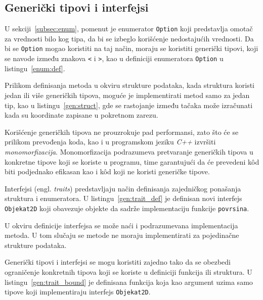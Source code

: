 \documentclass[12pt,oneside]{memoir}
\begin{document}


\subsection{Generički tipovi i interfejsi}
U sekciji~\ref{subsec:enum}, pomenut je enumerator \texttt{Option} koji predstavlja
omotač za vrednosti bilo kog tipa, da bi se izbeglo korišćenje nedostajućih vrednosti.
Da bi se \texttt{Option} mogao koristiti na taj način, moraju se koristiti generički
tipovi, koji se navode između znakova \texttt{<} i \texttt{>}, kao u
definiciji enumeratora \texttt{Option} u listingu~\ref{enum:def}.

Prilikom definisanja metoda u okviru strukture podataka, kada struktura koristi
jedan ili više generičkih tipova, moguće je implementirati metod samo za jedan
tip, kao u listingu~\ref{gen:struct}, gde se rastojanje između tačaka može
izračunati kada su koordinate zapisane u pokretnom zarezu.



Korišćenje generičkih tipova ne prouzrokuje pad performansi, zato što će
se prilikom prevođenja koda, kao i u programskom jeziku \textit{C++}
izvršiti \textit{monomorfizacija}. Monomorfizacija
podrazumeva pretvaranje generičkih tipova u konkretne tipove koji se koriste u
programu, time garantujući da će prevedeni kôd biti podjednako efikasan kao
i kôd koji ne koristi generičke tipove.

Interfejsi (engl. \emph{traits}) predstavljaju način definisanja zajedničkog ponašanja
struktura i enumeratora. U listingu~\ref{gen:trait_def} je definisan novi
interfejs \texttt{Objekat2D} koji obavezuje objekte da sadrže implementaciju
funkcije \texttt{povrsina}.



U okviru definicije interfejsa se može naći i podrazumevana implementacija metoda.
U tom slučaju se metode ne moraju implementirati za pojedinačne strukture podataka.

Generički tipovi i interfejsi se mogu koristiti zajedno tako da se obezbedi ograničenje
konkretnih tipova koji se koriste u definiciji funkcija ili struktura. U
listingu~\ref{gen:trait_bound} je definisana funkcija koja kao argument uzima samo
tipove koji implementiraju interfejs \texttt{Objekat2D}.
\end{document}
